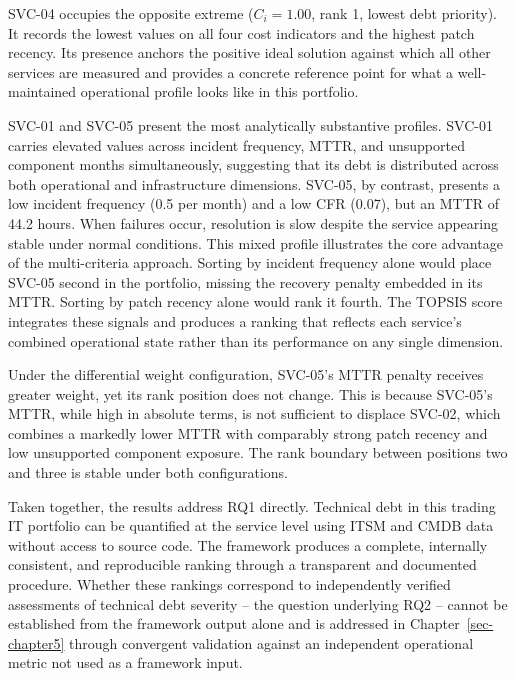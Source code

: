\documentclass[
  12pt,
  letterpaper,
  12pt,
  oneside,
  english,
  onehalfspacing,
  headsepline]{MastersDoctoralThesis}
\begin{document}
SVC-04 occupies the opposite extreme (\(C_i = 1.00\), rank 1, lowest
debt priority). It records the lowest values on all four cost indicators
and the highest patch recency. Its presence anchors the positive ideal
solution against which all other services are measured and provides a
concrete reference point for what a well-maintained operational profile
looks like in this portfolio.

SVC-01 and SVC-05 present the most analytically substantive profiles.
SVC-01 carries elevated values across incident frequency, MTTR, and
unsupported component months simultaneously, suggesting that its debt is
distributed across both operational and infrastructure dimensions.
SVC-05, by contrast, presents a low incident frequency (0.5 per month)
and a low CFR (0.07), but an MTTR of 44.2 hours. When failures occur,
resolution is slow despite the service appearing stable under normal
conditions. This mixed profile illustrates the core advantage of the
multi-criteria approach. Sorting by incident frequency alone would place
SVC-05 second in the portfolio, missing the recovery penalty embedded in
its MTTR. Sorting by patch recency alone would rank it fourth. The
TOPSIS score integrates these signals and produces a ranking that
reflects each service's combined operational state rather than its
performance on any single dimension.

Under the differential weight configuration, SVC-05's MTTR penalty
receives greater weight, yet its rank position does not change. This is
because SVC-05's MTTR, while high in absolute terms, is not sufficient
to displace SVC-02, which combines a markedly lower MTTR with comparably
strong patch recency and low unsupported component exposure. The rank
boundary between positions two and three is stable under both
configurations.

Taken together, the results address RQ1 directly. Technical debt in this
trading IT portfolio can be quantified at the service level using ITSM
and CMDB data without access to source code. The framework produces a
complete, internally consistent, and reproducible ranking through a
transparent and documented procedure. Whether these rankings correspond
to independently verified assessments of technical debt severity -- the
question underlying RQ2 -- cannot be established from the framework
output alone and is addressed in Chapter~\ref{sec-chapter5} through
convergent validation against an independent operational metric not used
as a framework input.

\end{document}

